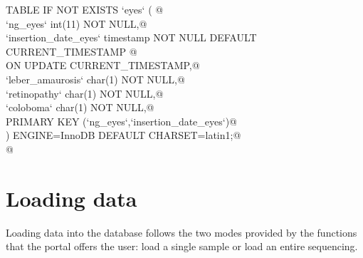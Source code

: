 \documentclass[a4paper]{report}
\begin{document}
\begin{flushleft} \small \label{scrap1}
\begin{list}{}{} \item
\mbox{}\verb@CREATE TABLE IF NOT EXISTS `eyes` ( @\\
\mbox{}\verb@  `ng_eyes` int(11) NOT NULL,@\\
\mbox{}\verb@  `insertion_date_eyes` timestamp NOT NULL DEFAULT CURRENT_TIMESTAMP @\\
\mbox{}\verb@      ON UPDATE CURRENT_TIMESTAMP,@\\
\mbox{}\verb@  `leber_amaurosis` char(1) NOT NULL,@\\
\mbox{}\verb@  `retinopathy` char(1) NOT NULL,@\\
\mbox{}\verb@  `coloboma` char(1) NOT NULL,@\\
\mbox{}\verb@  PRIMARY KEY (`ng_eyes`,`insertion_date_eyes`)@\\
\mbox{}\verb@) ENGINE=InnoDB DEFAULT CHARSET=latin1;@\\
\mbox{}\verb@ @\\
\end{list}
\vspace{-1ex}
\footnotesize\addtolength{\baselineskip}{-1ex}
\end{flushleft}



\section{Loading data}
Loading data into the database follows the two modes provided by the functions that the portal offers the user: load a single sample or load an entire sequencing.
\end{document}
